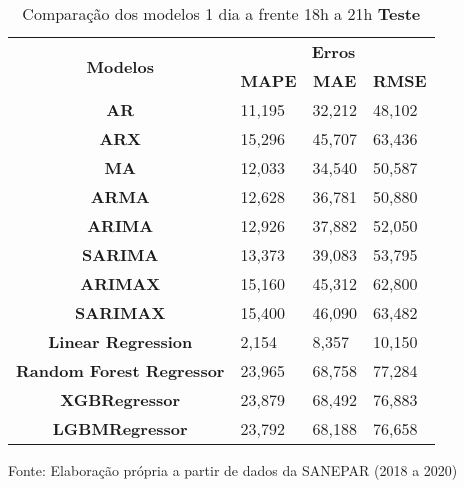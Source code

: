 \begin{table}[H]
	\centering
	\caption{Comparação dos modelos 1 dia a frente 18h a 21h \textbf{Teste} }\label{tb:1-18tst}
	\begin{tabular}{@{}clll@{}}
		\toprule
		\multirow{2}{*}{\textbf{Modelos}} & \multicolumn{3}{c}{\textbf{Erros}}                                                                       \\ \cmidrule(l){2-4} 
		& \multicolumn{1}{c}{\textbf{MAPE}} & \multicolumn{1}{c}{\textbf{MAE}} & \multicolumn{1}{c}{\textbf{RMSE}} \\ \hline
		\textbf{AR}                       & 11,195                            & 32,212                           & 48,102                            \\
		\textbf{ARX}                      & 15,296                            & 45,707                           & 63,436                            \\
		\textbf{MA}                       & 12,033                            & 34,540                           & 50,587                            \\
		\textbf{ARMA}                     & 12,628                            & 36,781                           & 50,880                            \\
		\textbf{ARIMA}                    & 12,926                            & 37,882                           & 52,050                            \\
		\textbf{SARIMA}                   & 13,373                            & 39,083                           & 53,795                            \\
		\textbf{ARIMAX}                   & 15,160                            & 45,312                           & 62,800                            \\
		\textbf{SARIMAX}                  & 15,400                            & 46,090                           & 63,482                            \\
		\textbf{Linear Regression}        & 2,154                             & 8,357                            & 10,150                            \\
		\textbf{Random Forest Regressor}  & 23,965                            & 68,758                           & 77,284                            \\
		\textbf{XGBRegressor}             & 23,879                            & 68,492                           & 76,883                            \\
		\textbf{LGBMRegressor}            & 23,792                            & 68,188                           & 76,658                            \\ \hline
		\end{tabular}
	
	Fonte: Elaboração própria a partir de dados da SANEPAR (2018 a 2020)
\end{table}

